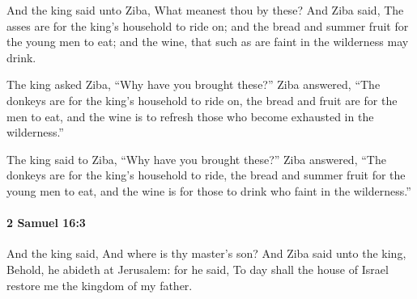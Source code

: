 			\begin{versebox}
					\item[BHS] 
					\item[ASV] And the king said unto Ziba, What meanest thou by these? And Ziba said, The asses are for the king's household to ride on; and the bread and summer fruit for the young men to eat; and the wine, that such as are faint in the wilderness may drink.
					\item[NIV] The king asked Ziba, “Why have you brought these?” Ziba answered, “The donkeys are for the king’s household to ride on, the bread and fruit are for the men to eat, and the wine is to refresh those who become exhausted in the wilderness.”
					\item[NRSV] The king said to Ziba, “Why have you brought these?” Ziba answered, “The donkeys are for the king’s household to ride, the bread and summer fruit for the young men to eat, and the wine is for those to drink who faint in the wilderness.”
			\end{versebox}

		\paragraph{2 Samuel 16:3} %
			\label{2SAMUEL-16-3}

			And the king said, And where is thy master’s son? And Ziba said unto the king, Behold, he abideth at Jerusalem: for he said, To day shall the house of Israel restore me the kingdom of my father.

